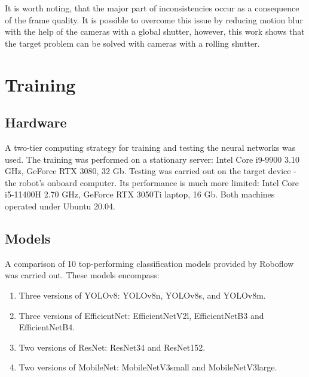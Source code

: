 \begin{description}
\begin{table}[ht]
\end{table}

It is worth noting, that the major part of inconsistencies occur as a consequence of the frame quality. It is possible to overcome this issue by reducing motion blur with the help of the cameras with a global shutter, however, this work shows that the target problem can be solved with cameras with a rolling shutter.
\section{Training}
\label{sec_training}
\subsection{Hardware}
A two-tier computing strategy for training and testing the neural networks was used.
The training was performed on a stationary server: Intel Core i9-9900 3.10 \si{GHz}, GeForce RTX 3080, 32 \si{Gb}.
Testing was carried out on the target device - the robot's onboard computer. Its performance is much more limited: Intel Core i5-11400H 2.70 \si{GHz}, GeForce RTX 3050Ti laptop, 16 Gb.
Both machines operated under Ubuntu 20.04.

\subsection{Models}
A comparison of 10 top-performing classification models provided by Roboflow \cite{lin2022roboflow} was carried out. These models encompass:

\begin{enumerate}
    \item Three versions of YOLOv8\cite{jocher2022ultralytics}: YOLOv8n, YOLOv8s, and YOLOv8m.
    \item Three versions of EfficientNet\cite{tan2019efficientnet}: EfficientNetV2l, EfficientNetB3 and EfficientNetB4.
    \item Two versions of ResNet\cite{he2016deep}: ResNet34 and ResNet152.
    \item Two versions of MobileNet\cite{howard2017mobilenets}: MobileNetV3small and MobileNetV3large.
\end{enumerate}


\end{description}
